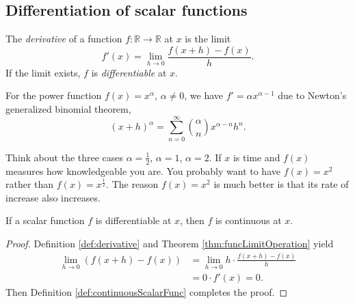 \subsection{Differentiation of scalar functions}
\label{sec:diff-funct}

\begin{defn}
  \label{def:derivative}
  The \emph{derivative}
   of a function $f: \mathbb{R}\rightarrow \mathbb{R}$
   at $x$ is the limit
   \begin{equation}
     \label{eq:derivative}
     f'(x)=\lim_{h\rightarrow 0} \frac{f(x+h)-f(x)}{h}.
   \end{equation}
  If the limit exists, $f$ is \emph{differentiable} at $x$.
\end{defn}

\begin{exm}
  For the power function \mbox{$f(x)=x^{\alpha}$}, $\alpha\neq 0$,
   we have $f'=\alpha x^{\alpha-1}$
   due to
   Newton's generalized binomial theorem, 
  \begin{equation*}
    (x+h)^{\alpha}=\sum_{n=0}^{\infty}{\alpha \choose n}x^{\alpha-n}h^n.
  \end{equation*}
\end{exm}

\begin{rem}
  Think about the three cases $\alpha=\frac{1}{2}$,
  $\alpha=1$, $\alpha=2$.
  If $x$ is time and $f(x)$ measures how knowledgeable you are.
  You probably want to have $f(x)=x^2$ rather than
  $f(x)=x^{\frac{1}{2}}$.
  The reason $f(x)=x^2$ is much better is that
  its rate of increase also increases.
\end{rem}

\begin{lem}
  \label{lem:differentiabilityImplyCoutinuity}
  If a scalar function $f$ is differentiable at $x$,
  then $f$ is continuous at $x$.
\end{lem}
\begin{proof}
  Definition \ref{def:derivative} and
  Theorem \ref{thm:funcLimitOperation} yield
  \begin{align*}
    \lim_{h\rightarrow 0} \left( f(x+h)-f(x)  \right)
    &= \lim_{h\rightarrow0} h\cdot \frac{f(x+h)-f(x)}{h}  \\
    &=0\cdot f'(x)=0.
  \end{align*}
  Then Definition \ref{def:continuousScalarFunc} completes the proof.
\end{proof}

